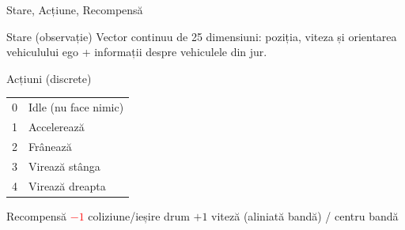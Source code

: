 \documentclass[aspectratio=169]{beamer}
\begin{document}
\begin{frame}{Stare, Acțiune, Recompensă}
  \begin{block}{Stare (observație)}
    Vector continuu de 25 dimensiuni: poziția, viteza și orientarea vehiculului ego + informații despre vehiculele din jur.
  \end{block}
  
  \begin{block}{Acțiuni (discrete)}
    \begin{tabular}{cl}
      0 & Idle (nu face nimic) \\
      1 & Accelerează \\
      2 & Frânează \\
      3 & Virează stânga \\
      4 & Virează dreapta \\
    \end{tabular}
  \end{block}
  
  \begin{block}{Recompensă}
    \textcolor{red}{$-1$} coliziune/ieșire drum \quad \textcolor{green!60!black}{$+1$} viteză (aliniată bandă) / centru bandă
  \end{block}
\end{frame}
\end{document}
